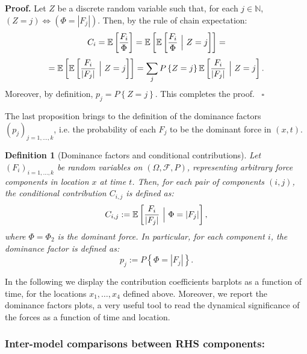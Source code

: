 \documentclass{article}
\newtheorem{definition}[theorem]{Definition}
\newenvironment{proof}[1][Proof]{\noindent\textbf{#1.} }{\ $\square$}
\begin{document}
\begin{proof}
Let $Z$ be a discrete random variable such that, for each $j\in\mathbb N$, $(Z=j) \Longleftrightarrow (\Phi=|F_j|)$. Then, by the rule of chain expectation:
$$C_i=\mathbb E\left[\frac{F_i}{\Phi}\right]=\mathbb E\left[\mathbb E\left[\frac{F_i}{\Phi}\ \Big{|}\ Z=j\right]\right]=$$
$$=\mathbb E\left[\mathbb E\left[\frac{F_i}{|F_j|}\ \Big{|}\ Z=j\right]\right]=\sum_j P\left\{Z=j\right\} \mathbb E\left[\frac{F_i}{|F_j|}\ \Big{|}\ Z=j\right].$$
Moreover, by definition, $p_j=P\left\{Z=j\right\}$. This completes the proof.
\end{proof}

The last proposition brings to the definition of the dominance factors $(p_j)_{j=1,\dots, k}$, i.e. the probability of each $F_j$ to be the dominant force in $(x,t)$.

\begin{definition}[Dominance factors and conditional contributions]
Let $(F_i)_{i=1,\dots, k}$ be random variables on $(\Omega, \mathcal F, P)$, representing arbitrary force components in location $x$ at time $t$. Then, for each pair of components $(i,j)$, the conditional contribution $C_{i,j}$ is defined as:
$$C_{i,j}:=\mathbb E\left[\frac{F_i}{|F_j|}\ \Big{|}\ \Phi=|F_j|\right],$$
where $\Phi=\Phi_2$ is the dominant force. In particular, for each component $i$, the dominance factor is defined as:
$$p_j:=P\left\{\Phi=|F_j|\right\}.$$
\end{definition}

In the following we display the contribution coefficients barplots as a function of time, for the locations $x_1,\dots,x_4$ defined above. Moreover, we report the dominance factors plots, a very useful tool to read the dynamical significance of the forces as a function of time and location.

\subsubsection{Inter-model comparisons between RHS components:}\label{subsubsec:ramp-intermodelsPrs}
\end{document}
